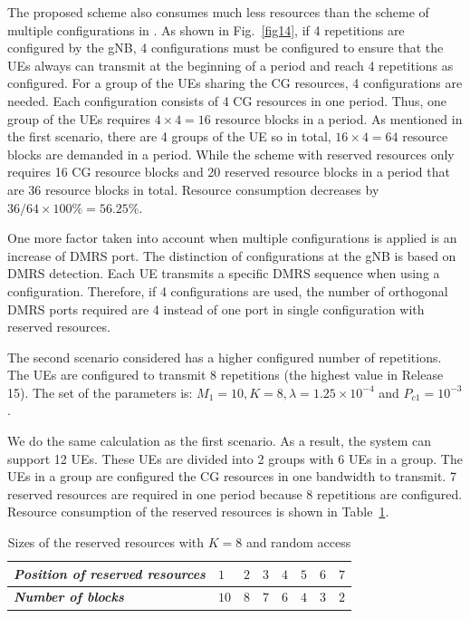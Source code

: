 \documentclass{ieeeaccess}
\begin{document}
The proposed scheme also consumes much less resources than the scheme of multiple configurations in  \cite{ref7}. As shown in Fig.~\ref{fig14}, if 4 repetitions are configured by the gNB, 4 configurations must be configured to ensure that the UEs always can transmit at the beginning of a period and reach 4 repetitions as configured. For a group of the UEs sharing the CG resources, 4 configurations are needed. Each configuration consists of 4 CG resources in one period. Thus, one group of the UEs requires $4\times4 = 16$ resource blocks in a period. As mentioned in the first scenario, there are 4 groups of the UE so in total, $16\times4 = 64$ resource blocks are demanded in a period. While the scheme with reserved resources only requires 16 CG resource blocks and 20 reserved resource blocks in a period that are 36 resource blocks in total. Resource consumption decreases by $36/64\times100\% = 56.25\%$.

One more factor taken into account when multiple configurations is applied is an increase of DMRS port. The distinction of configurations at the gNB is based on DMRS detection. Each UE transmits a specific DMRS sequence when using a configuration. Therefore, if 4 configurations are used, the number of orthogonal DMRS ports required are 4 instead of one port in single configuration with reserved resources.


The second scenario considered has a higher configured number of repetitions. The UEs are configured to transmit 8 repetitions (the highest value in Release 15). The set of the parameters is: $M_1=10, K=8, \lambda=1.25\times10^{-4}$ and $P_{c1}=10^{-3}$.

We do the same calculation as the first scenario. As a result, the system can support 12 UEs. These UEs are divided into 2 groups with 6 UEs in a group. The UEs in a group are configured the CG resources in one bandwidth to transmit. 7 reserved resources are required in one period because 8 repetitions are configured. Resource consumption of the reserved resources is shown in Table~\ref{tab4}.

\begin{table}[htbp]
\caption{Sizes of the reserved resources with $K=8$ and random access}
\begin{center}
\begin{tabular}{|p{5em}|p{2em}|p{2em}|p{2em}|p{2em}|p{2em}|p{2em}|p{2em}|}
 \hline
 \textbf{\textit{Position of reserved resources}} & $1$ &$2$ &$3$ & $4$ &$5$ &$6$ &$7$\\ 
 \hline
 \textbf{\textit{Number of blocks}} & $10$ &$8$ &$7$ & $6$ &$4$ &$3$ &$2$\\

 
 \hline
\end{tabular}
\label{tab4}
\vspace{-2mm}
\end{center}

\end{table}
\end{document}

